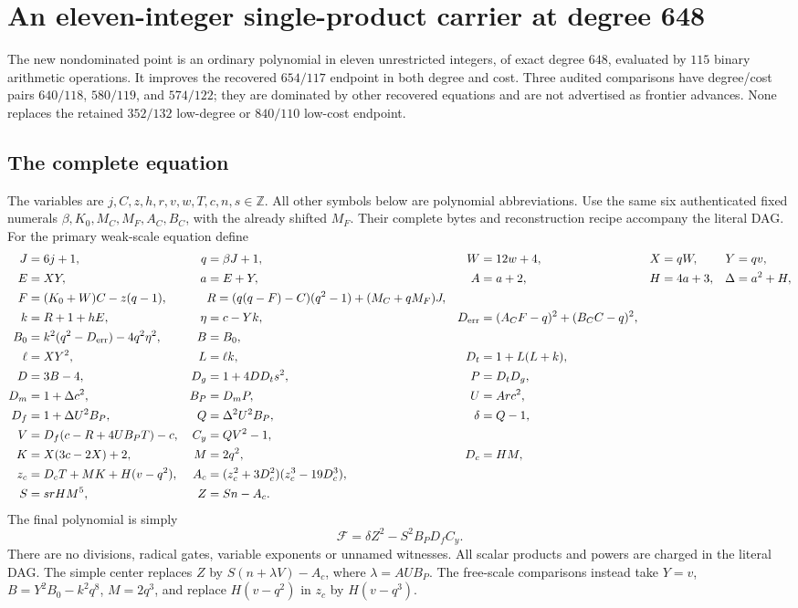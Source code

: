 \section{An eleven-integer single-product carrier at degree 648}
\label{sec:integer-product}
The new nondominated point is an ordinary polynomial in eleven unrestricted
integers, of exact degree \(648\), evaluated by \(115\) binary arithmetic
operations. It improves the recovered \(654/117\) endpoint in both degree and
cost. Three audited comparisons have degree/cost pairs \(640/118\),
\(580/119\), and \(574/122\); they are dominated by other recovered equations
and are not advertised as frontier advances. None replaces the retained
\(352/132\) low-degree or \(840/110\) low-cost endpoint.

\subsection{The complete equation}
The variables are \(j,C,z,h,r,v,w,T,c,n,s\in\mathbb Z\). All other symbols
below are polynomial abbreviations. Use the same six authenticated fixed
numerals \(\beta,K_0,M_C,M_F,A_C,B_C\), with the already shifted \(M_F\).
Their complete bytes and reconstruction recipe accompany the literal DAG.
For the primary weak-scale equation define
\begin{align*}
 J&=6j+1,&q&=\beta J+1,&W&=12w+4,&X&=qW,&Y&=qv,\\
 E&=XY,&a&=E+Y,&A&=a+2,&H&=4a+3,&\Delta&=a^2+H,\\
 F&=(K_0+W)C-z(q-1),&&
 R=(q(q-F)-C)(q^2-1)+(M_C+qM_F)J,\\
 k&=R+1+hE,&\eta&=c-Yk,&
 D_{\rm err}&=(A_CF-q)^2+(B_CC-q)^2,\\
 B_0&=k^2(q^2-D_{\rm err})-4q^2\eta^2,&B&=B_0,\\
 \ell&=XY^2,&L&=\ell k,&D_t&=1+L(L+k),\\
 D&=3B-4,&D_g&=1+4DD_ts^2,&P&=D_tD_g,\\
 D_m&=1+\Delta c^2,&B_P&=D_mP,&U&=Arc^2,\\
 D_f&=1+\Delta U^2B_P,&Q&=\Delta^2U^2B_P,&\delta&=Q-1,\\
 V&=D_f(c-R+4UB_PT)-c,&C_y&=QV^2-1,\\
 K&=X(3c-2X)+2,&M&=2q^2,&D_c&=HM,\\
 z_c&=D_cT+MK+H(v-q^2),&
 A_c&=(z_c^2+3D_c^2)(z_c^3-19D_c^3),\\
 S&=srHM^5,&Z&=Sn-A_c.
\end{align*}
The final polynomial is simply
\[
 \boxed{\mathcal F=\delta Z^2-S^2B_PD_fC_y.}
\]
There are no divisions, radical gates, variable exponents or unnamed
witnesses. All scalar products and powers are charged in the literal DAG.
The simple center replaces \(Z\) by \(S(n+\lambda V)-A_c\), where
\(\lambda=AUB_P\). The free-scale comparisons instead take
\(Y=v\), \(B=Y^2B_0-k^2q^8\), \(M=2q^3\), and replace
\(H(v-q^2)\) in \(z_c\) by \(H(v-q^3)\).

